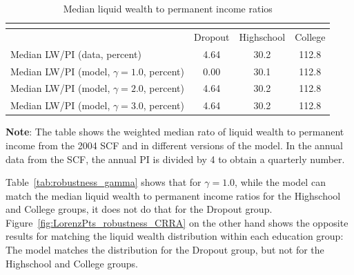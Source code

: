 \documentclass[../HAFiscal]{subfiles}
\begin{document}
\begin{table}[th]
\begin{center}
\begin{tabular}{lccc}
	\multicolumn{4}{l}{} \\ \midrule
	& Dropout & Highschool & College \\ \midrule
	Median LW/PI (data, percent) & 4.64 & 30.2 & 112.8 \\ 
	Median LW/PI (model, $\gamma = 1.0$, percent) & 0.00 & 30.1 & 112.8 \\	
	Median LW/PI (model, $\gamma = 2.0$, percent) & 4.64 & 30.2 & 112.8 \\
	Median LW/PI (model, $\gamma = 3.0$, percent) & 4.64 & 30.2 & 112.8 \\ \bottomrule
\end{tabular}
\caption{Median liquid wealth to permanent income ratios}
\label{tab:robustness_gamma_liquid}	
\parbox{15cm}{\small \vspace{.05cm} \textbf{Note}: The table shows the weighted median rato of liquid wealth to permanent income from the 2004 SCF and in different versions of the model. In the annual data from the SCF, the annual PI is divided by 4 to obtain a quarterly number.\normalsize}
\end{center}
\end{table}

Table~\ref{tab:robustness_gamma} shows that for $\gamma=1.0$, while the model can match the median liquid wealth to permanent income ratios for the Highschool and College groups, it does not do that for the Dropout group. Figure~\ref{fig:LorenzPts_robustness_CRRA} on the other hand shows the opposite results for matching the liquid wealth distribution within each education group: The model matches the distribution for the Dropout group, but not for the Highschool and College groups. 
\end{document}
